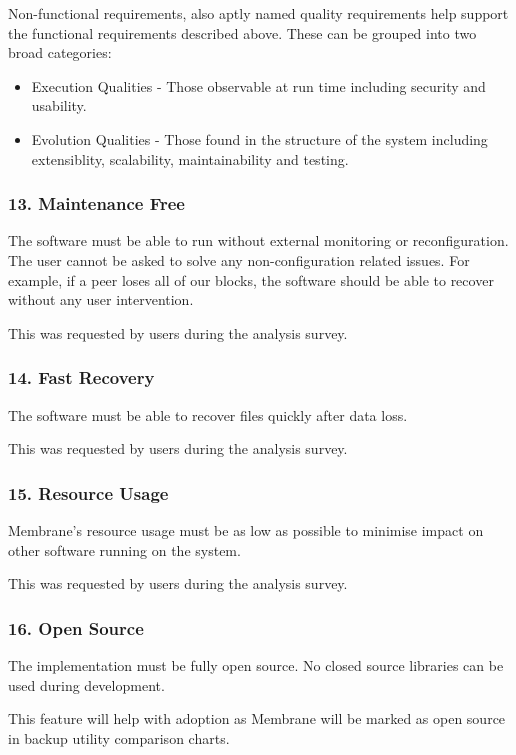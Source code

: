 \documentclass[11pt, a4paper, twocolumn, twoside]{report}
\begin{document}
Non-functional requirements, also aptly named quality requirements help support the functional requirements described above. These can be grouped into two broad categories:
\begin{itemize}
 \item Execution Qualities - Those observable at run time including security and usability.
 \item Evolution Qualities - Those found in the structure of the system including extensiblity, scalability, maintainability and testing.
\end{itemize}

\subsubsection{13. Maintenance Free}
The software must be able to run without external monitoring or reconfiguration. The user cannot be asked to solve any non-configuration related issues. For example, if a peer loses all of our blocks, the software should be able to recover without any user intervention.

This was requested by users during the analysis survey.

\subsubsection{14. Fast Recovery}
The software must be able to recover files quickly after data loss.

This was requested by users during the analysis survey.

\subsubsection{15. Resource Usage}
Membrane's resource usage must be as low as possible to minimise impact on other software running on the system.

This was requested by users during the analysis survey.

\subsubsection{16. Open Source}

The implementation must be fully open source. No closed source libraries can be used during development.

This feature will help with adoption as Membrane will be marked as open source in backup utility comparison charts.
\end{document}
